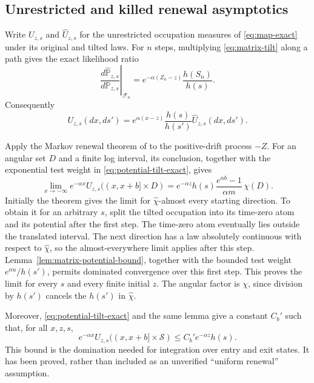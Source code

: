 \subsection{Unrestricted and killed renewal asymptotics}
Write $U_{z,s}$ and $\widehat U_{z,s}$ for the unrestricted occupation
measures of \eqref{eq:map-exact} under its original and tilted laws.
For $n$ steps, multiplying \eqref{eq:matrix-tilt} along a path gives
the exact likelihood ratio
\begin{equation}
 \left.\frac{d\widehat{\mathbb P}_{z,s}}
 {d\mathbb P_{z,s}}\right|_{\mathcal F_n}
 = e^{-\alpha(Z_n-z)}\frac{h(S_n)}{h(s)}.
 \label{eq:matrix-rn}
\end{equation}
Consequently
\begin{equation}
 U_{z,s}(dx,ds')=
 e^{\alpha(x-z)}\frac{h(s)}{h(s')}
 \widehat U_{z,s}(dx,ds').
 \label{eq:potential-tilt-exact}
\end{equation}

Apply the Markov renewal theorem of \citet[Theorem 1]{alsmeyer1997}
to the positive-drift process $-Z$. For an angular set $D$ and a finite
log interval, its conclusion, together with the exponential test
weight in \eqref{eq:potential-tilt-exact}, gives
\begin{equation}
 \lim_{x\to-\infty}e^{-\alpha x}U_{z,s}((x,x+b]\times D)
 = e^{-\alpha z}h(s)
 \frac{e^{\alpha b}-1}{\alpha m}\,
 \chi(D).
 \label{eq:unrestricted-matrix-renewal}
\end{equation}
Initially the theorem gives the limit for $\widehat\chi$-almost every
starting direction. To obtain it for an arbitrary $s$, split the
tilted occupation into its time-zero atom and its potential after the
first step. The time-zero atom eventually lies outside the translated
interval. The next direction has a law absolutely continuous with
respect to $\widehat\chi$, so the almost-everywhere limit applies after
this step. Lemma~\ref{lem:matrix-potential-bound}, together with the
bounded test weight $e^{\alpha u}/h(s')$, permits dominated convergence
over this first step. This proves the limit for every $s$ and every
finite initial $z$. The angular factor is $\chi$, since division by
$h(s')$ cancels the $h(s')$ in $\widehat\chi$.

Moreover, \eqref{eq:potential-tilt-exact} and the same lemma give a
constant $C_b'$ such that, for all $x,z,s$,
\begin{equation}
 e^{-\alpha x}U_{z,s}((x,x+b]\times\mathcal S)
 \le C_b'e^{-\alpha z}h(s).
 \label{eq:original-renewal-domination}
\end{equation}
This bound is the domination needed for integration over entry and exit
states. It has been proved, rather than included as an unverified
``uniform renewal'' assumption.

